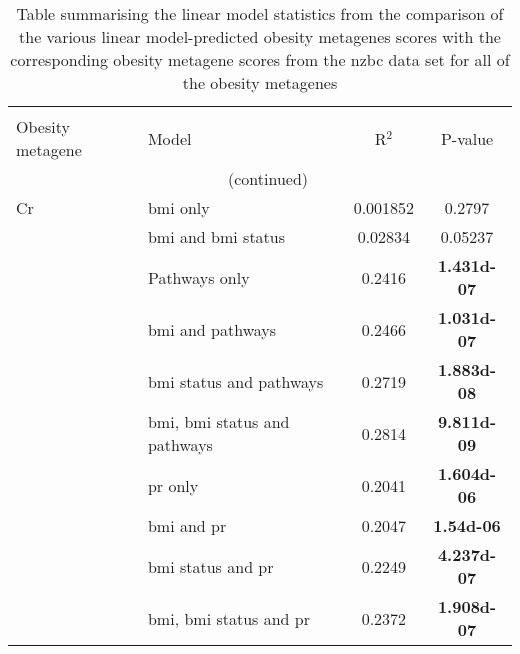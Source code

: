 \begin{ThreePartTable}
			\begin{longtable}{llcc}
				\centering
				\caption[Summary of the statistics from the comparison of all the predicted obesity metagene scores with the corresponding obesity metagenes from the \gls{nzbc} data]{Table summarising the linear model statistics from the comparison of the various linear model-predicted obesity metagenes scores with the corresponding obesity metagene scores from the \gls{nzbc} data set for all of the obesity metagenes}
				\label{tab:prediction_summary_cris}\\
				Obesity metagene & Model                         & R$^2$      & P-value   \\
				\endfirsthead
				\multicolumn{4}{c}{\tablename\ \thetable{}\ (continued)}\\
				\hline
				\hline
				\endhead
				\hline
				\hline
				\rule{0pt}{2.25ex}Cr      & \gls{bmi} only                           & 0.001852   & 0.2797                              \\
                                          & \gls{bmi} and \gls{bmi} status           & 0.02834    & 0.05237                             \\
                                          & Pathways only                            & 0.2416     & {\bfseries \num{1.431d-07}}\tnote{1} \\
                                          & \gls{bmi} and pathways                   & 0.2466     & \bfseries \num{1.031d-07}           \\
                                          & \gls{bmi} status and pathways            & 0.2719     & \bfseries \num{1.883d-08}           \\
                                          & \gls{bmi}, \gls{bmi} status and pathways & 0.2814     & \bfseries \num{9.811d-09}           \\
                                          & \gls{pr} only                            & 0.2041     & \bfseries \num{1.604d-06}           \\
                                          & \gls{bmi} and \gls{pr}                   & 0.2047     & \bfseries \num{1.54d-06}            \\
                                          & \gls{bmi} status and \gls{pr}            & 0.2249     & \bfseries \num{4.237d-07}           \\
                                          & \gls{bmi}, \gls{bmi} status and \gls{pr} & 0.2372     & \bfseries \num{1.908d-07}           \\

\end{longtable}
\end{ThreePartTable}
